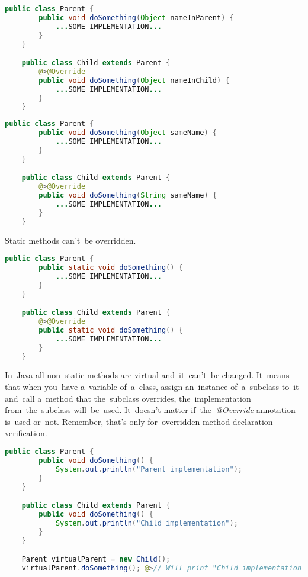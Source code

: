 \begin{lstlisting}[language=Java]
    public class Parent {
        public void doSomething(Object nameInParent) {
            ...SOME IMPLEMENTATION...
        }
    }

    public class Child extends Parent {
        @>@Override
        public void doSomething(Object nameInChild) {
            ...SOME IMPLEMENTATION...
        }
    }
\end{lstlisting}

\begin{lstlisting}[language=Java]
    public class Parent {
        public void doSomething(Object sameName) {
            ...SOME IMPLEMENTATION...
        }
    }

    public class Child extends Parent {
        @>@Override
        public void doSomething(String sameName) {
            ...SOME IMPLEMENTATION...
        }
    }
\end{lstlisting}

\warning Static methods can't~be overridden.

\begin{lstlisting}[language=Java]
    public class Parent {
        public static void doSomething() {
            ...SOME IMPLEMENTATION...
        }
    }

    public class Child extends Parent {
        @>@Override
        public static void doSomething() {
            ...SOME IMPLEMENTATION...
        }
    }
\end{lstlisting}

\label{javavirtualmethods}
In~Java all non--static methods are virtual and~it~can't~be changed.
It~means that when you~have a~variable of~a~class, assign an~instance of~a~subclass to~it and~call a~method that the~subclass overrides, the~implementation from~the~subclass will~be~used.
It~doesn't matter if~the~\textit{@Override} annotation is~used or~not.
Remember, that's only for~overridden method declaration verification.

\begin{lstlisting}[language=Java]
    public class Parent {
        public void doSomething() {
            System.out.println("Parent implementation");
        }
    }

    public class Child extends Parent {
        public void doSomething() {
            System.out.println("Child implementation");
        }
    }

    Parent virtualParent = new Child();
    virtualParent.doSomething(); @>// Will print "Child implementation"
\end{lstlisting}

